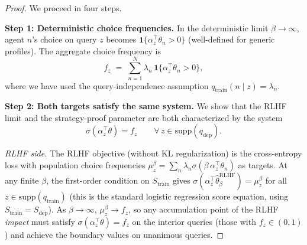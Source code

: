 
\begin{proof}
    We proceed in four steps.

    \medskip
    \noindent\textbf{Step 1: Deterministic choice frequencies.}
    In the deterministic limit $\beta \to \infty$, agent $n$'s choice 
    on query $z$ becomes $\mathbf{1}\{\alpha_z^\top \theta_n > 0\}$ 
    (well-defined for generic profiles). The aggregate choice frequency is
    \begin{equation}\label{eq:fz-def}
        f_z 
        \;=\; \sum_{n=1}^N \lambda_n \,\mathbf{1}\{\alpha_z^\top \theta_n > 0\},
    \end{equation}
    where we have used the query-independence assumption 
    $q_{\mathrm{train}}(n \mid z) = \lambda_n$.

    \medskip
    \noindent\textbf{Step 2: Both targets satisfy the same system.}
    We show that the RLHF limit and the strategy-proof parameter 
    are both characterized by the system
    \begin{equation}\label{eq:sigmoid-system}
        \sigma(\alpha_z^\top \theta) = f_z 
        \qquad \forall\, z \in \mathrm{supp}(q_{\mathrm{dep}}).
    \end{equation}

    \emph{RLHF side.} The RLHF objective (without KL regularization) is 
    the cross-entropy loss with population choice frequencies $\mu_z^\beta 
    = \sum_n \lambda_n \sigma(\beta\,\alpha_z^\top \theta_n)$ as targets.
    At any finite $\beta$, the first-order condition on 
    $S_{\mathrm{train}}$ gives 
    $\sigma(\alpha_z^\top \hat{\theta}_\beta^{\mathrm{RLHF}}) = \mu_z^\beta$
    for all $z \in \mathrm{supp}(q_{\mathrm{train}})$ 
    (this is the standard logistic regression score equation, 
    using $S_{\mathrm{train}} = S_{\mathrm{dep}}$). 
    As $\beta \to \infty$, $\mu_z^\beta \to f_z$, so any accumulation 
    point of the RLHF \emph{impact} must satisfy 
    $\sigma(\alpha_z^\top \theta) = f_z$ on the interior queries 
    (those with $f_z \in (0,1)$) and achieve the boundary values 
    on unanimous queries.


\end{proof}
